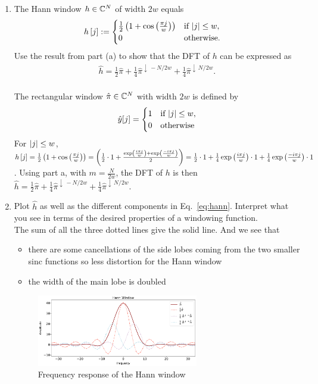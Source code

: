 \documentclass[12pt,twoside]{article}
\begin{document}
\begin{enumerate}
\begin{enumerate}
 \item The Hann window $h \in \mathbb{C}^{N}$ of width $2w$ equals
\begin{align}
h\left[ j \right] & :=  
 \begin{cases}
  \frac{1}{2} \left( 1 + \cos \left(  \frac{ \pi j}{w} \right) \right) & \text{if } \lvert j\rvert \leq w,\\
   0 & \text{otherwise.}
  \end{cases}
\end{align} 
Use the result from part (a) to show that the DFT of $h$ can be expressed as
\begin{align}
\label{eq:hann}
\hat{h} = \frac{1}{2}\hat{\pi} + \frac{1}{4}\hat{\pi}^{\downarrow \, -N/2w} + \frac{1}{4}\hat{\pi}^{\downarrow \, N/2w}.
\end{align}\\
 The rectangular window $\hat{\pi} \in  \mathbb{C}^{N}$ with width $2w$ is defined by
\begin{equation*}
  \hat{y}[j] =
    \begin{cases}
      1 & \text{if } \lvert j\rvert \leq w,\\
      0 & \text{otherwise}
    \end{cases}       
\end{equation*}
For $\lvert j\rvert \leq w$, $h\left[ j \right] =  \frac{1}{2} \left( 1 + \cos \left(  \frac{ \pi j}{w} \right) \right) =  \left( \frac{1}{2}  \cdot 1 +  \frac{ \exp \left( \frac{i \pi j}{w}  \right) 
+  \exp \left( \frac{-i \pi j}{w}  \right)} {2}  \right) = \frac{1}{2}  \cdot 1  +  \frac{1}{4}  \exp \left( \frac{i \pi j}{w}  \right) \cdot 1 + \frac{1}{4}  \exp \left( \frac{-i \pi j}{w}  \right) \cdot 1$.
Using part a, with $m= \frac{N}{2w}$, the DFT of  $h$ is then $\hat{h} = \frac{1}{2}\hat{\pi} + \frac{1}{4}\hat{\pi}^{\downarrow \, -N/2w} + \frac{1}{4}\hat{\pi}^{\downarrow \, N/2w}$.


\item Plot $\hat{h}$ as well as the different components in Eq.~\eqref{eq:hann}. Interpret what you see in terms of the desired properties of a windowing function. \\
The sum of all the three dotted lines give the solid line. And we see that
\begin{itemize}
	\item there are some cancellations of the side lobes coming from the two smaller sinc functions so less distortion for the Hann window
	\item the width of the main lobe is doubled
\end{itemize}

\begin{figure}[H]
		\centering
		\captionsetup{justification=centering}
		\includegraphics[width=200pt]{code/images/Hann.pdf}
		\caption{Frequency response of the Hann window}
	\end{figure}


\end{enumerate}
\end{enumerate}
\end{document}
